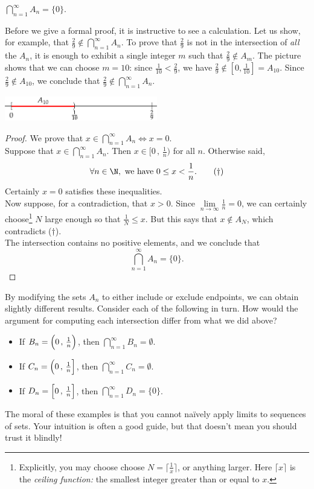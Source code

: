 \begin{thm}
$\bigcap\limits_{n=1}^\infty A_n=\{0\}$.
\end{thm}

\noindent Before we give a formal proof, it is instructive to see a calculation. Let us show, for example, that $\frac 29\not\in\bigcap\limits_{n=1}^\infty A_n$. To prove that $\frac 29$ is not in the intersection of \emph{all} the $A_n$, it is enough to exhibit a single integer $m$ such that $\frac 29\not\in A_m$. The picture shows that we can choose $m=10$: since $\frac 1{10}<\frac 29$, we have $\frac 29\not\in [0,\frac 1{10}]=A_{10}$. Since $\frac 29\not\in A_{10}$, we conclude that $\frac 29\not\in\bigcap\limits_{n=1}^\infty A_n$.
\begin{center}
\includegraphics[width=0.5\textwidth]{setsii-06-intervalex}
\end{center}

\begin{proof}
We prove that $x\in\bigcap\limits_{n=1}^\infty A_n\iff x=0$.\\
Suppose that $x\in\bigcap\limits_{n=1}^\infty A_n$. Then $x\in\bigl[0\,,\,\frac 1n\bigr)$ for all $n$. Otherwise said,
\[\forall n\in\N,\text{ we have }0\le x<\frac 1n.\tag*{($\dag$)}\]
Certainly $x=0$ satisfies these inequalities.\\
Now suppose, for a contradiction, that $x>0$. Since $\lim\limits_{n\to\infty}\frac 1n=0$, we can certainly choose\footnote{Explicitly, you may choose choose $N=\lceil\frac 1x\rceil$, or anything larger. Here $\lceil x\rceil$ is the \emph{ceiling function:} the smallest integer greater than or equal to $x$.} $N$ large enough so that $\frac 1N\le x$. But this says that $x\not\in A_N$, which contradicts ($\dag$).\\
The intersection contains no positive elements, and we conclude that
\[\bigcap\limits_{n=1}^\infty A_n=\{0\}.\tag*{\qedhere}\]
\end{proof}

\noindent By modifying the sets $A_n$ to either include or exclude endpoints, we can obtain slightly different results. Consider each of the following in turn. How would the argument for computing each intersection differ from what we did above?
\begin{itemize}
  \item If $B_n=\Bigl(0\,,\,\frac 1n\Bigr)$, then $\bigcap\limits_{n=1}^\infty B_n=\emptyset$.
  \item If $C_n=\Bigl(0\,,\,\frac 1n\Bigr]$, then $\bigcap\limits_{n=1}^\infty C_n=\emptyset$.
  \item If $D_n=\Bigl[0\,,\,\frac 1n\Bigr]$, then $\bigcap\limits_{n=1}^\infty D_n=\{0\}$.
\end{itemize}
The moral of these examples is that you cannot naïvely apply limits to sequences of sets. Your intuition is often a good guide, but that doesn't mean you should trust it blindly!\\

